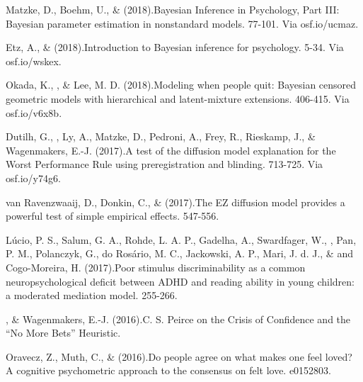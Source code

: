 \item[45.] Matzke, D., Boehm, U., \& \vdkh{} (2018).\newblock Bayesian Inference in Psychology, Part III: Bayesian parameter estimation in nonstandard models. 77-101. Via osf.io/ucmaz.%

\item[44.] Etz, A., \& \vdkh{} (2018).\newblock Introduction to Bayesian inference for psychology. 5-34. Via osf.io/wskex.%

\item[43.] Okada, K., \vdkh{}, \& Lee, M. D. (2018).\newblock Modeling when people quit: Bayesian censored geometric models with hierarchical and latent-mixture extensions. 406-415. Via osf.io/v6x8b.%

\item[42.] Dutilh, G., \vdkh{}, Ly, A., Matzke, D., Pedroni, A., Frey, R., Rieskamp, J., \& Wagenmakers, E.-J. (2017).\newblock A test of the diffusion model explanation for the Worst Performance Rule using preregistration and blinding. 713-725. Via osf.io/y74g6.%

\item[41.] van Ravenzwaaij, D., Donkin, C., \& \vdkh{} (2017).\newblock The EZ diffusion model provides a powerful test of simple empirical effects. 547-556. %

\item[40.] L\'{u}cio, P. S., Salum, G. A., Rohde, L. A. P., Gadelha, A., Swardfager,  W., \vdkh{}, Pan, P. M., Polanczyk, G., do Ros\'{a}rio, M. C., Jackowski, A. P., Mari, J. d. J., \& and Cogo-Moreira, H. (2017).\newblock Poor stimulus discriminability as a common neuropsychological deficit between ADHD and reading ability in young children: a  moderated mediation model. 255-266. %

\item[39.] \vdkh{}, \& Wagenmakers, E.-J. (2016).\newblock C. S. Peirce on the Crisis of Confidence and the ``No More Bets'' Heuristic. %

\item[38.] Oravecz, Z., Muth, C., \& \vdkh{} (2016).\newblock Do people agree on what makes one feel loved? A cognitive psychometric approach to the consensus on felt love. e0152803. %

